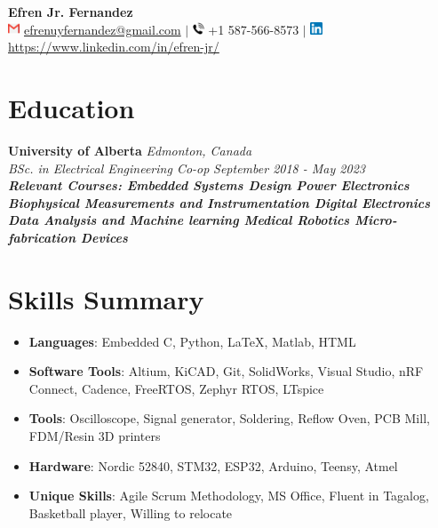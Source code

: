 \documentclass[letterpaper,20pt]{article}
\newcommand{\resumeItem}[2]{
  \item\small{
    \textbf{#1}{: #2 \vspace{-2pt}}
  }
}
\newcommand{\resumeSubItem}[2]{\resumeItem{#1}{#2}\vspace{-3pt}}
\newcommand{\resumeSubHeadingListStart}{\begin{itemize}[leftmargin=*]}
\newcommand{\resumeSubHeadingListEnd}{\end{itemize}}
\begin{document}
\begin{center}
    {\huge \textbf{Efren Jr. Fernandez}} \vspace{5pt}\\ %
    \includegraphics[height = 10pt]{images/Gmail_icon_(2020).png} \href{mailto:}{efrenuyfernandez@gmail.com} $\vert$
    \includegraphics[height = 10pt]{phone.png}
    +1 587-566-8573 $\vert$
    \includegraphics[height = 10pt]{images/linkedin_logo.png} \href{https://www.linkedin.com/in/efren-jr/}{https://www.linkedin.com/in/efren-jr/}  
    
\end{center}


\section{Education}
    \vspace{-1pt}
        \textbf{University of Alberta} \hspace{10.7cm}
        \textit{Edmonton, Canada} \\
        \textit{BSc. in Electrical Engineering Co-op}\hspace{8.25 cm}
        \textit{September 2018 - May 2023} \\
        \vspace{-10pt}
      {\scriptsize \textit{ \footnotesize{\newline{}\textbf{Relevant Courses: Embedded Systems Design \textbullet{} Power Electronics \textbullet{} Biophysical Measurements and Instrumentation \textbullet{} Digital Electronics \textbullet{} Data Analysis and Machine learning \textbullet{} Medical Robotics \textbullet{} Micro-fabrication Devices } }}}

\section{Skills Summary}
	\resumeSubHeadingListStart
	  \resumeSubItem{Languages}{\hspace{3em}Embedded C, Python, LaTeX, Matlab, HTML}
	  \resumeSubItem{Software Tools}{\hspace{0.8em}Altium, KiCAD, Git, SolidWorks, Visual Studio, nRF Connect, Cadence, FreeRTOS, Zephyr RTOS, LTspice}
	  \resumeSubItem{Tools}{\hspace{5.5em}Oscilloscope, Signal generator, Soldering, Reflow Oven, PCB Mill, FDM/Resin 3D printers}
    \resumeSubItem{Hardware}{\hspace{3.3em}Nordic 52840, STM32, ESP32, Arduino, Teensy, Atmel}
    \resumeSubItem{Unique Skills}{\hspace{1.6em}Agile Scrum Methodology, MS Office, Fluent in Tagalog, Basketball player, Willing to relocate}
  \resumeSubHeadingListEnd
\vspace{-3pt}
\end{document}

